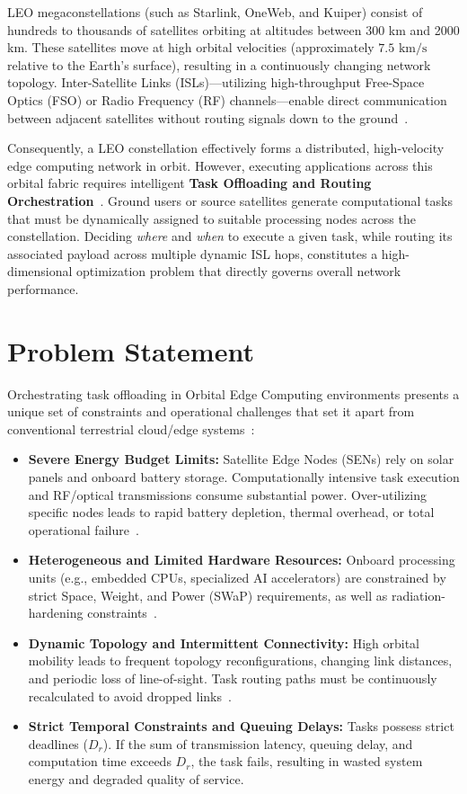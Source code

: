 LEO megaconstellations (such as Starlink, OneWeb, and Kuiper) consist of hundreds to thousands of satellites orbiting at altitudes between 300 km and 2000 km. These satellites move at high orbital velocities (approximately $7.5 \text{ km/s}$ relative to the Earth's surface), resulting in a continuously changing network topology. Inter-Satellite Links (ISLs)—utilizing high-throughput Free-Space Optics (FSO) or Radio Frequency (RF) channels—enable direct communication between adjacent satellites without routing signals down to the ground~\cite{chen2021isl, chaudhry2021laser}. 

Consequently, a LEO constellation effectively forms a distributed, high-velocity edge computing network in orbit. However, executing applications across this orbital fabric requires intelligent \textbf{Task Offloading and Routing Orchestration}~\cite{zhong2025leo, fan2025satellite}. Ground users or source satellites generate computational tasks that must be dynamically assigned to suitable processing nodes across the constellation. Deciding \textit{where} and \textit{when} to execute a given task, while routing its associated payload across multiple dynamic ISL hops, constitutes a high-dimensional optimization problem that directly governs overall network performance.

\section{Problem Statement}
\label{sec:intro_problem_statement}

Orchestrating task offloading in Orbital Edge Computing environments presents a unique set of constraints and operational challenges that set it apart from conventional terrestrial cloud/edge systems~\cite{icdcs_satellite_2025}:

\begin{itemize}
    \item \textbf{Severe Energy Budget Limits:} Satellite Edge Nodes (SENs) rely on solar panels and onboard battery storage. Computationally intensive task execution and RF/optical transmissions consume substantial power. Over-utilizing specific nodes leads to rapid battery depletion, thermal overhead, or total operational failure~\cite{icdcs_satellite_2025}.
    \item \textbf{Heterogeneous and Limited Hardware Resources:} Onboard processing units (e.g., embedded CPUs, specialized AI accelerators) are constrained by strict Space, Weight, and Power (SWaP) requirements, as well as radiation-hardening constraints~\cite{denby2020asplos}.
    \item \textbf{Dynamic Topology and Intermittent Connectivity:} High orbital mobility leads to frequent topology reconfigurations, changing link distances, and periodic loss of line-of-sight. Task routing paths must be continuously recalculated to avoid dropped links~\cite{chen2021isl}.
    \item \textbf{Strict Temporal Constraints and Queuing Delays:} Tasks possess strict deadlines ($D_r$). If the sum of transmission latency, queuing delay, and computation time exceeds $D_r$, the task fails, resulting in wasted system energy and degraded quality of service.
\end{itemize}


